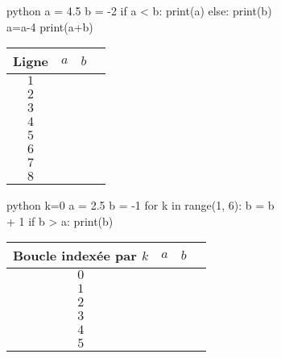 


\begin{figure}[h]
\begin{subfigure}{.5\textwidth}
\vspace{15pt}
\begin{mintedbox}{python}
a = 4.5
b = -2
if a < b:
	print(a)
else:
	print(b)
a=a-4
print(a+b)
\end{mintedbox}
\end{subfigure}
\hfill
\begin{subfigure}{.4\textwidth}
	\begin{tabular}{|c|c|c|c|}\hline
		Ligne & $a$ & $b$ \\ \hline
		$1$ && \\ \hline
		$2$ && \\ \hline
		$3$ && \\ \hline
		$4$ && \\ \hline
		$5$ && \\ \hline
		$6$ && \\ \hline
		$7$ && \\ \hline
		$8$ && \\ \hline
	\end{tabular}
\end{subfigure}

\begin{subfigure}{.5\textwidth}
\vspace{15pt}
\begin{mintedbox}{python}
k=0
a = 2.5
b = -1
for k in range(1, 6):
	b = b + 1
	if b > a:
		print(b)
\end{mintedbox}
\end{subfigure}
\hfill
\begin{subfigure}{.45\textwidth}
	\begin{tabular}{|c|c|c|c|}\hline
		Boucle indexée par $k$ & $a$ & $b$ \\ \hline
		$0$ && \\ \hline
		$1$ && \\ \hline
		$2$ && \\ \hline
		$3$ && \\ \hline
		$4$ && \\ \hline
		$5$ && \\ \hline
	\end{tabular}
\end{subfigure}


\end{figure}

